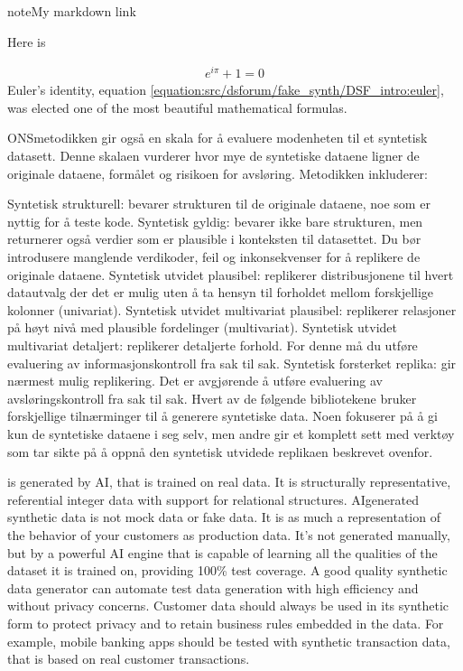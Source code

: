 \documentclass[letterpaper,10pt,english]{jupyterBook}
\begin{document}
\begin{sphinxadmonition}{note}{My markdown link}

\sphinxAtStartPar
Here is 
\end{sphinxadmonition}
\begin{equation}\label{equation:src/dsforum/fake_synth/DSF_intro:euler}
\begin{split}e^{i\pi} + 1 = 0\end{split}
\end{equation}
\sphinxAtStartPar
Euler’s identity, equation \eqref{equation:src/dsforum/fake_synth/DSF_intro:euler}, was elected one of the
most beautiful mathematical formulas.

\sphinxAtStartPar
ONS\sphinxhyphen{}metodikken gir også en skala for å evaluere modenheten til et syntetisk datasett. Denne skalaen vurderer hvor mye de syntetiske dataene ligner de originale dataene, formålet og risikoen for avsløring. Metodikken inkluderer:

\sphinxAtStartPar
Syntetisk strukturell: bevarer strukturen til de originale dataene, noe som er nyttig for å teste kode.
Syntetisk gyldig: bevarer ikke bare strukturen, men returnerer også verdier som er plausible i konteksten til datasettet. Du bør introdusere manglende verdikoder, feil og inkonsekvenser for å replikere de originale dataene.
Syntetisk utvidet plausibel: replikerer distribusjonene til hvert datautvalg der det er mulig uten å ta hensyn til forholdet mellom forskjellige kolonner (univariat).
Syntetisk utvidet multivariat plausibel: replikerer relasjoner på høyt nivå med plausible fordelinger (multivariat).
Syntetisk utvidet multivariat detaljert: replikerer detaljerte forhold. For denne må du utføre evaluering av informasjonskontroll fra sak til sak.
Syntetisk forsterket replika: gir nærmest mulig replikering. Det er avgjørende å utføre evaluering av avsløringskontroll fra sak til sak.
Hvert av de følgende bibliotekene bruker forskjellige tilnærminger til å generere syntetiske data. Noen fokuserer på å gi kun de syntetiske dataene i seg selv, men andre gir et komplett sett med verktøy som tar sikte på å oppnå den syntetisk utvidede replikaen beskrevet ovenfor.

\sphinxAtStartPar
{}
  is generated by AI, that is trained on real data. It is structurally representative, referential integer data with support for relational structures. AI\sphinxhyphen{}generated synthetic data is not mock data or fake data. It is as much a representation of the behavior of your customers as production data. It’s not generated manually, but by a powerful AI engine that is capable of learning all the qualities of the dataset it is trained on, providing 100\% test coverage. A good quality synthetic data generator can automate test data generation with high efficiency and without privacy concerns. Customer data should always be used in its synthetic form to protect privacy and to retain business rules embedded in the data. For example, mobile banking apps should be tested with synthetic transaction data, that is based on real customer transactions.
\end{document}
